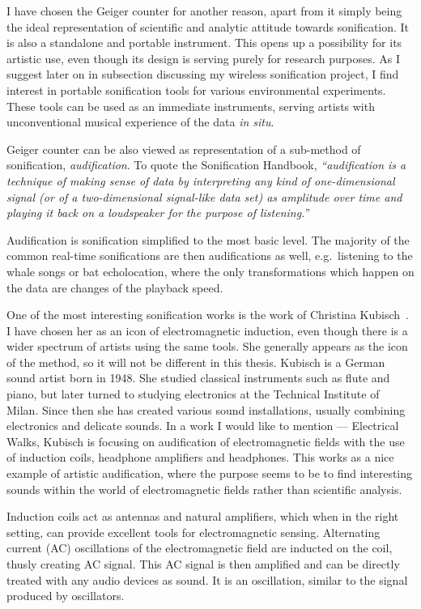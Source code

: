 \documentclass[12pt,a4paper,oneside]{report}
\begin{document}
I have chosen the Geiger counter for another reason, apart from it simply being the ideal representation of scientific and analytic attitude towards sonification. It is also a standalone and portable instrument. This opens up a possibility for its artistic use, even though its design is serving purely for research purposes. As I suggest later on in subsection discussing my wireless sonification project, I find interest in portable sonification tools for various environmental experiments. These tools can be used as an immediate instruments, serving artists with unconventional musical experience of the data \emph{in situ}.  

Geiger counter can be also viewed as representation of a sub-method of sonification, \emph{audification}. To quote the Sonification Handbook,  \emph{``audification is a technique of making sense of data by interpreting any kind of one-dimensional signal (or of a two-dimensional signal-like data set) as amplitude over time and playing it back on a loudspeaker for the purpose of listening.''}~\cite[p.~301]{audif}

Audification is sonification simplified to the most basic level. The majority of the common real-time sonifications are then audifications as well, e.g.\ listening to the whale songs or bat echolocation, where the only transformations which happen on the data are changes of the playback speed.

One of the most interesting sonification works is the work of Christina Kubisch~\cite{ChKubisch2012}. I have chosen her as an icon of electromagnetic induction, even though there is a wider spectrum of artists using the same tools. She generally appears as the icon of the method, so it will not be different in this thesis. Kubisch is a German sound artist born in 1948. She studied classical instruments such as flute and piano, but later turned to studying electronics at the Technical Institute of Milan. Since then she has created various sound installations, usually combining electronics and delicate sounds. In a work I would like to mention --- Electrical Walks, Kubisch is focusing on audification of electromagnetic fields with the use of induction coils, headphone amplifiers and headphones. This works as a nice example of artistic audification, where the purpose seems to be to find interesting sounds within the world of electromagnetic fields rather than scientific analysis. 

Induction coils act as antennas and natural amplifiers, which when in the right setting, can provide excellent tools for electromagnetic sensing. Alternating current (AC) oscillations of the electromagnetic field are inducted on the coil, thusly creating AC signal. This AC signal is then amplified and can be directly treated with any audio devices as sound. It is an oscillation, similar to the signal produced by oscillators.
\end{document}

